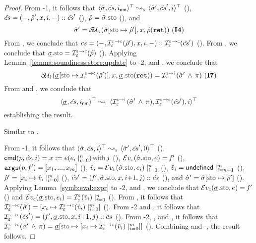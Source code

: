 \begin{proof}
\noindent {}
From \hyp{1}, it follows that $\abssemrule{\sstate, \scs, \retlab}{\sstate', \scs', i}{\top}{\top}{\symbolic}$ (), 
$\hat{cs} = (-, \hat\rho', x, i, -) :: \hat{cs}'$ (), $\sstore = \sstate.\stosel$ (), 
and 
$$\sstate' = \stupdt{\symbolic}(\sstate[\stosel \mapsto \sstore'], \jvar, \sstore(\retvar)) \text{ (\ieq{4})}$$
From , we conclude that $\cs = (-, \interpret{\symbconc}{\senv}(\sstore'), \jvar, i, -) :: \interpret{\symbconc}{\senv}(\scs')$ (). 
From , we conclude that $\istate.\stosel = \interpret{\symbconc}{\senv}(\sstore)$ (). 
Applying Lemma~\ref{lemma:soundiness:store:update} to \hyp{2},  and , we conclude that 
$$
\stupdt{\instrumented}(\istate[\stosel \mapsto \interpret{\symbconc}{\senv}(\sstore')], \jvar, \istate.\stosel(\retvar)) = \interpret{\symbinst}{\senv}(\sstate' \, \wedge \, \pc)
 \text{ (\ieq{7})}
$$ 
From  and , we conclude that 
$$\abssemrule{\istate, \scs, \retlab}{\interpret{\symbinst}{\senv}(\sstate' \, \wedge \, \pc), \interpret{\symbconc}{\senv}(\scs'), i}{\top}{\top}{\instrumented}$$ 
establishing the result. 
 \vspace{5pt}

\noindent {}
Similar to . 
 \vspace{5pt}


\noindent {}
From \hyp{1}, it follows that $\abssemrule{\sstate, \scs, i}{\sstate', \scs', 0}{\top}{\top}{\symbolic}$ (), 
$\ccmd[\prog][\scs]{i} =   \jsilcall{\jvar}{\jsilexpr}{\jsilexpr_i \mid_{i = 0}^{n}}{j}$ (), 
$\evalexpr{\symbolic}(\sstate.\stosel, \jsilexpr) =  \pid'$ (), 
$\mathtt{args}(p, \mathit{f}') = [ x_1, ..., x_{m} ]$ (), 
$\sexprv_i = \evalexpr{\symbolic}(\sstate.\stosel, \jsilexpr_i) \mid_{i = 0}^{n}$ (), 
$\hat{v}_i = {\sf undefined} \mid_{i = n+1}^{m}$ (), 
$\hat\rho' = [x_i \mapsto \hat{v}_i \mid_{i = 0}^{m}]$ (),  
$\scs' = (\pid', \sstate.\stosel, \jvar, i{+}1, j) :: \scs$ (), and 
$\sstate' = \sstate[\stosel \mapsto \sstore']$ (). 
Applying Lemma~\ref{symb:eval:expr} to \hyp{2},  and , we conclude that 
$\evalexpr{\concrete}(\istate.\stosel, \jsilexpr) =  \pid'$ () 
and 
$\evalexpr{\concrete}(\istate.\stosel, \jsilexpr_i) = \interpret{\symbolic}{\senv}(\sexprv_i) \mid_{i = 0}^{n}$ (). 
From , it follows that $\interpret{\symbconc}{\senv}(\sstore') = [\jvar_i \mapsto \interpret{\symbconc}{\senv}(\sexprv_i) \mid_{i = 0}^{m}]$ (). 
From \hyp{2} and , it follows that $\interpret{\symbconc}{\senv}(\scs') = (\pid', \istate.\stosel, \jvar, i{+}1, j) :: \cs$ ().
From \hyp{2}, , and , it follows that 
$\interpret{\symbconc}{\senv}(\sstate' \, \wedge \, \pc) = \istate[\stosel \mapsto  [\jvar_i \mapsto \interpret{\symbconc}{\senv}(\sexprv_i) \mid_{i = 0}^{m}]]$ (). 
Combining  and -, the result follows. 
\vspace{5pt}


\end{proof}
